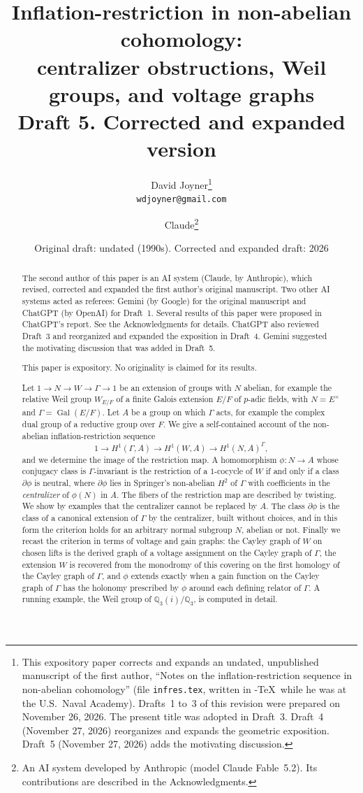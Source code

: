 \documentclass[12pt,letterpaper]{article}
\title{Inflation-restriction in non-abelian cohomology:\\
centralizer obstructions, Weil groups, and voltage graphs\\[4pt]
\large Draft 5. Corrected and expanded version}
\author{David Joyner\thanks{This expository paper corrects and expands an
undated, unpublished manuscript of the first author, ``Notes on the
inflation-restriction sequence in non-abelian cohomology'' (file
\texttt{infres.tex}, written in \AmS-\TeX\ while he was at the U.S.\ Naval
Academy). Drafts~1 to~3 of this revision were prepared on November 26,
2026. The present title was adopted in Draft~3. Draft~4 (November 27, 2026) reorganizes and expands the geometric
exposition. Draft~5 (November 27, 2026) adds the motivating discussion.}\\
\texttt{wdjoyner@gmail.com}
\and Claude\thanks{An AI system developed by Anthropic (model Claude
Fable~5.2). Its contributions are described in the Acknowledgments.}}
\date{Original draft: undated (1990s). Corrected and expanded draft: 2026}
\numberwithin{equation}{section}
\theoremstyle{plain}
\theoremstyle{definition}
\newcommand{\Q}{\mathbb{Q}}
\DeclareMathOperator{\Gal}{Gal}
\begin{document}
\maketitle

\begin{abstract}
The second author of this paper is an AI system (Claude, by Anthropic),
which revised, corrected and expanded the first author's original
manuscript. Two other AI systems acted as referees: Gemini (by Google)
for the original manuscript and ChatGPT (by OpenAI) for Draft~1. Several
results of this paper were proposed in ChatGPT's report. See the
Acknowledgments for details. ChatGPT also reviewed Draft~3 and
reorganized and expanded the exposition in Draft~4. Gemini suggested the
motivating discussion that was added in Draft~5.

This paper is expository. No originality is claimed for its results.

Let $1\to N\to W\to\Gamma\to 1$ be an extension of groups with $N$ abelian,
for example the relative Weil group $W_{E/F}$ of a finite Galois extension
$E/F$ of $p$-adic fields, with $N=E^\times$ and $\Gamma=\Gal(E/F)$. Let $A$
be a group on which $\Gamma$ acts, for example the complex dual group of a
reductive group over $F$. We give a self-contained account of the
non-abelian inflation-restriction sequence
\[
1\to H^1(\Gamma,A)\to H^1(W,A)\to H^1(N,A)^\Gamma ,
\]
and we determine the image of the restriction map. A homomorphism
$\phi:N\to A$ whose conjugacy class is $\Gamma$-invariant is the restriction
of a $1$-cocycle of $W$ if and only if a class $\partial\phi$ is neutral, where
$\partial\phi$ lies in Springer's non-abelian $H^2$ of $\Gamma$ with
coefficients in the \emph{centralizer} of $\phi(N)$ in $A$. The fibers of the
restriction map are described by twisting. We show by examples that the
centralizer cannot be replaced by $A$. The class $\partial\phi$ is the
class of a canonical extension of $\Gamma$ by the centralizer, built
without choices, and in this form the criterion holds for an arbitrary
normal subgroup $N$, abelian or not. Finally we recast the criterion in
terms of voltage and gain graphs: the Cayley graph of $W$ on chosen lifts is the derived
graph of a voltage assignment on the Cayley graph of $\Gamma$, the
extension $W$ is recovered from the monodromy of this covering on the
first homology of the Cayley graph of $\Gamma$, and $\phi$ extends exactly
when a gain function on the Cayley graph of $\Gamma$ has the holonomy
prescribed by $\phi$ around each defining relator of $\Gamma$. A running
example, the Weil group of $\Q_3(i)/\Q_3$, is computed in detail.
\end{abstract}
\end{document}
